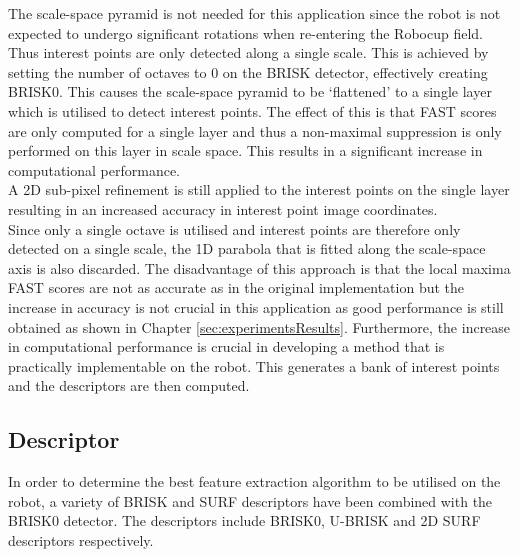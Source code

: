 \documentclass[11pt]{report}
\begin{document}
The scale-space pyramid is not needed for this application since the robot is not expected to undergo significant rotations when re-entering the Robocup field. Thus interest points are only detected along a single scale. This is achieved by setting the number of octaves to $0$ on the BRISK detector, effectively creating BRISK0. This causes the scale-space pyramid to be `flattened' to a single layer which is utilised to detect interest points. The effect of this is that FAST scores are only computed for a single layer and thus a non-maximal suppression is only performed on this layer in scale space. This results in a significant increase in computational performance. \\


A 2D sub-pixel refinement is still applied to the interest points on the single layer resulting in an increased accuracy in interest point image coordinates.\\

Since only a single octave is utilised and interest points are therefore only detected on a single scale, the 1D parabola that is fitted along the scale-space axis \cite{Leutenegger2011} is also discarded. The disadvantage of this approach is that the local maxima FAST scores are not as accurate as in the original implementation but the increase in accuracy is not crucial in this application as good performance is still obtained as shown in Chapter \ref{sec:experimentsResults}. Furthermore, the increase in computational performance is crucial in developing a method that is practically implementable on the robot. This generates a bank of interest points and the descriptors are then computed.\\

\subsection{Descriptor}
\label{sec:BRISK0Describe}
In order to determine the best feature extraction algorithm to be utilised on the robot, a variety of BRISK and SURF descriptors have been combined with the BRISK0 detector. The descriptors include BRISK0, U-BRISK and 2D SURF descriptors respectively.\\
\end{document}
